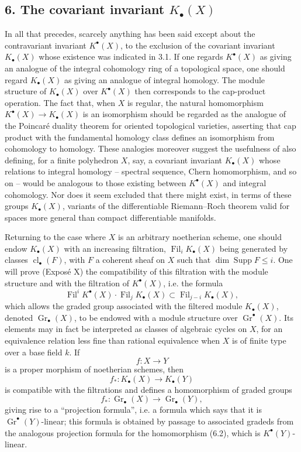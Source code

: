 \documentclass[11pt]{article}
\newcommand{\Gr}{\operatorname{Gr}}
\newcommand{\Fil}{\operatorname{Fil}}
\newcommand{\cl}{\operatorname{cl}}
\begin{document}
\subsection*{6. The covariant invariant $K_\bullet(X)$}
In all that precedes, scarcely anything has been said except about the contravariant invariant $K^\bullet(X)$, to the exclusion of the covariant invariant $K_\bullet(X)$ whose existence was indicated in 3.1. If one regards $K^\bullet(X)$ as giving an analogue of the integral cohomology ring of a topological space, one should regard $K_\bullet(X)$ as giving an analogue of integral homology. The module structure of $K_\bullet(X)$ over $K^\bullet(X)$ then corresponds to the cap-product operation. The fact that, when $X$ is regular, the natural homomorphism $K^\bullet(X)\to K_\bullet(X)$ is an isomorphism should be regarded as the analogue of the Poincar\'e duality theorem for oriented topological varieties, asserting that cap product with the fundamental homology class defines an isomorphism from cohomology to homology. These analogies moreover suggest the usefulness of also defining, for a finite polyhedron $X$, say, a covariant invariant $K_\bullet(X)$ whose relations to integral homology -- spectral sequence, Chern homomorphism, and so on -- would be analogous to those existing between $K^\bullet(X)$ and integral cohomology. Nor does it seem excluded that there might exist, in terms of these groups $K_\bullet(X)$, variants of the differentiable Riemann--Roch theorem valid for spaces more general than compact differentiable manifolds.

Returning to the case where $X$ is an arbitrary noetherian scheme, one should endow $K_\bullet(X)$ with an increasing filtration, $\Fil_iK_\bullet(X)$ being generated by classes $\cl_\bullet(F)$, with $F$ a coherent sheaf on $X$ such that $\dim \operatorname{Supp}F\le i$. One will prove (Expos\'e X) the compatibility of this filtration with the module structure and with the filtration of $K^\bullet(X)$, i.e. the formula
\begin{equation}\tag{6.1}
\Fil^iK^\bullet(X)\cdot \Fil_jK_\bullet(X)\subset \Fil_{j-i}K_\bullet(X),
\end{equation}
which allows the graded group associated with the filtered module $K_\bullet(X)$, denoted $\Gr_\bullet(X)$, to be endowed with a module structure over $\Gr^\bullet(X)$. Its elements may in fact be interpreted as classes of algebraic cycles on $X$, for an equivalence relation less fine than rational equivalence when $X$ is of finite type over a base field $k$. If
\[
f:X\longrightarrow Y
\]
is a proper morphism of noetherian schemes, then
\begin{equation}\tag{6.2}
f_*:K_\bullet(X)\longrightarrow K_\bullet(Y)
\end{equation}
is compatible with the filtrations and defines a homomorphism of graded groups
\begin{equation}\tag{6.3}
f_*:\Gr_\bullet(X)\longrightarrow \Gr_\bullet(Y),
\end{equation}
giving rise to a ``projection formula'', i.e. a formula which says that it is $\Gr^\bullet(Y)$-linear; this formula is obtained by passage to associated gradeds from the analogous projection formula for the homomorphism (6.2), which is $K^\bullet(Y)$-linear.
\end{document}
